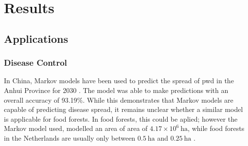 \section{Results}

\subsection{Applications}

\subsubsection{Disease Control}

In China, Markov models have been used to predict the spread of \gls{pwd} in the Anhui Province for 2030 \parencite{liu2022occurrence}.
The model was able to make predictions with an overall accuracy of 93.19\%.
While this demonstrates that Markov models are capable of predicting disease spread, it remains unclear whether a similar model is applicable for food forests.
In food forests, this could be aplied; however the Markov model used, modelled an area of area of $4.17 \times 10^6\:\text{ha}$, while food forests in the Netherlands are usually only between $0.5\:\text{ha}$ and $0.25\:\text{ha}$ \parencite{roodhof2024understanding}.

